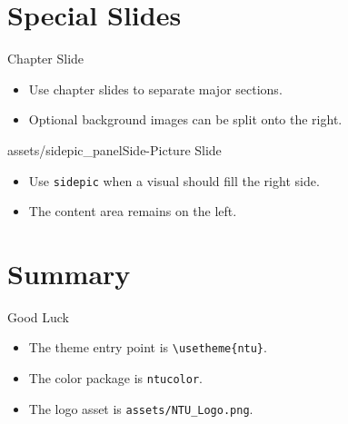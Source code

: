 \documentclass{beamer}
\begin{document}
\section{Special Slides}

\begin{chapter}{}{Chapter Slide}
\begin{itemize}
\item Use chapter slides to separate major sections.
\item Optional background images can be split onto the right.
\end{itemize}
\end{chapter}

\begin{sidepic}{assets/sidepic_panel}{Side-Picture Slide}
\begin{itemize}
\item Use \texttt{sidepic} when a visual should fill the right side.
\item The content area remains on the left.
\end{itemize}
\end{sidepic}

\footlinecolor{}
\section{Summary}

\begin{frame}{Good Luck}
\begin{itemize}
\item The theme entry point is \texttt{\textbackslash usetheme\{ntu\}}.
\item The color package is \texttt{ntucolor}.
\item The logo asset is \texttt{assets/NTU\_Logo.png}.
\end{itemize}
\end{frame}

\backmatter
\end{document}
